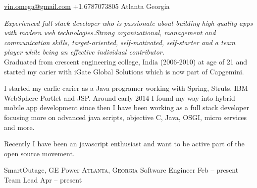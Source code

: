 \documentclass[10pt,a4paper]{article}
\begin{document}
\sloppy  %



\nobreakvspace{0.3em}  %

\noindent\href{mailto:vin.omega@gmail.com}{vin.omega\mbox{}@\mbox{}gmail.com}\sbull
\textsmaller
{+}1.6787073805\sbull
Atlanta\sbull
Georgia

\spacedhrule{0.9em}{-0.4em}  %


\vspace{-1.3em}  %
\begin{multicols}{2}  %
\noindent \emph{Experienced full stack developer who is passionate about building high quality apps with modern web technologies.Strong organizational, management and communication skills, target-oriented, self-motivated, self-starter and a team player while being an effective individual contributor.}
\\

Graduated from crescent engineering college, India (2006-2010) at age of 21 and started my carier with iGate Global Solutions which is now part of Capgemini.

I started my earlie carier as a Java programer working with Spring, Struts, IBM WebSphere Portlet and JSP. Around early 2014 I found my way into hybrid mobile app development since then I have been working as a full stack developer focusing more on advanced java scripts, objective C, Java, OSGI, micro services and more.

Recently I have been an javascript enthusiast and want to be active part of the open source movement. 
\end{multicols}


\spacedhrule{0em}{-0.4em}


\headedsection
  {\textnormal{SmartOutage, GE Power}}
  {\textsc{Atlanta, Georgia}} {
  \headedsubsection
    {Software Engineer}
    {Feb  -- present}
    {\bodytext{}}
  \headedsubsection
    {Team Lead}
    {Apr  -- present}
    {\bodytext{}}
}
\end{document}
